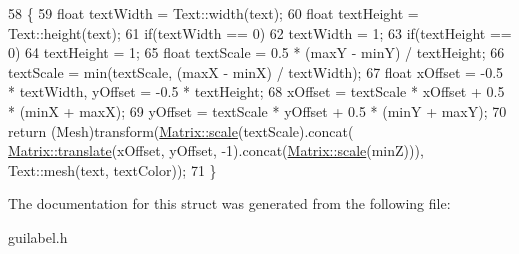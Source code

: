 \begin{DoxyCode}
58     \{
59         \textcolor{keywordtype}{float} textWidth = Text::width(text);
60         \textcolor{keywordtype}{float} textHeight = Text::height(text);
61         \textcolor{keywordflow}{if}(textWidth == 0)
62             textWidth = 1;
63         \textcolor{keywordflow}{if}(textHeight == 0)
64             textHeight = 1;
65         \textcolor{keywordtype}{float} textScale = 0.5 * (maxY - minY) / textHeight;
66         textScale = min(textScale, (maxX - minX) / textWidth);
67         \textcolor{keywordtype}{float} xOffset = -0.5 * textWidth, yOffset = -0.5 * textHeight;
68         xOffset = textScale * xOffset + 0.5 * (minX + maxX);
69         yOffset = textScale * yOffset + 0.5 * (minY + maxY);
70         \textcolor{keywordflow}{return} (Mesh)transform(\hyperlink{classMatrix_a1f36f7f62b8e99fea99880b6fc80a604}{Matrix::scale}(textScale).concat(
      \hyperlink{classMatrix_adf246c47bce77c3c53b9e804ec475e35}{Matrix::translate}(xOffset, yOffset, -1).concat(\hyperlink{classMatrix_a1f36f7f62b8e99fea99880b6fc80a604}{Matrix::scale}(minZ))), 
      Text::mesh(text, textColor));
71     \}
\end{DoxyCode}


The documentation for this struct was generated from the following file\+:\begin{DoxyCompactItemize}
\item 
guilabel.\+h\end{DoxyCompactItemize}
